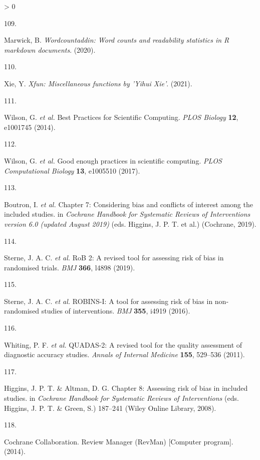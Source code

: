 \documentclass[a4paper, twoside]{templates/ociamthesis}
\newlength{\cslhangindent}
\newlength{\csllabelwidth}
\newenvironment{CSLReferences}[3] %
 {%
  \setlength{\parindent}{0pt}
  \ifodd #1 \everypar{\setlength{\hangindent}{\cslhangindent}}\ignorespaces\fi
  \ifnum #2 > 0
  \setlength{\parskip}{#2\baselineskip}
  \fi
 }%
 {}
\newcommand{\CSLLeftMargin}[1]{\parbox[t]{\maxof{\widthof{#1}}{\csllabelwidth}}{#1}}
\newcommand{\CSLRightInline}[1]{\parbox[t]{\linewidth - \csllabelwidth}{#1}}
\begin{document}
\begin{CSLReferences}{0}{0}
\leavevmode\hypertarget{ref-wordcountaddin}{}%
\CSLLeftMargin{109. }
\CSLRightInline{Marwick, B. \emph{Wordcountaddin: {Word} counts and readability statistics in {R} markdown documents}. (2020).}

\leavevmode\hypertarget{ref-xfun}{}%
\CSLLeftMargin{110. }
\CSLRightInline{Xie, Y. \emph{Xfun: {Miscellaneous} functions by '{Yihui Xie}'}. (2021).}

\leavevmode\hypertarget{ref-wilson2014}{}%
\CSLLeftMargin{111. }
\CSLRightInline{Wilson, G. \emph{et al.} Best {Practices} for {Scientific Computing}. \emph{PLOS Biology} \textbf{12}, e1001745 (2014).}

\leavevmode\hypertarget{ref-wilson2017}{}%
\CSLLeftMargin{112. }
\CSLRightInline{Wilson, G. \emph{et al.} Good enough practices in scientific computing. \emph{PLOS Computational Biology} \textbf{13}, e1005510 (2017).}

\leavevmode\hypertarget{ref-cochranechpt7}{}%
\CSLLeftMargin{113. }
\CSLRightInline{Boutron, I. \emph{et al.} Chapter 7: {Considering} bias and conflicts of interest among the included studies. in \emph{Cochrane {Handbook} for {Systematic Reviews} of {Interventions} version 6.0 (updated {August} 2019)} (eds. Higgins, J. P. T. et al.) ({Cochrane}, 2019).}

\leavevmode\hypertarget{ref-sterne2019rob}{}%
\CSLLeftMargin{114. }
\CSLRightInline{Sterne, J. A. C. \emph{et al.} {RoB} 2: A revised tool for assessing risk of bias in randomised trials. \emph{BMJ} \textbf{366}, l4898 (2019).}

\leavevmode\hypertarget{ref-sterne2016robins}{}%
\CSLLeftMargin{115. }
\CSLRightInline{Sterne, J. A. C. \emph{et al.} {ROBINS}-{I}: A tool for assessing risk of bias in non-randomised studies of interventions. \emph{BMJ} \textbf{355}, i4919 (2016).}

\leavevmode\hypertarget{ref-whiting2011quadas}{}%
\CSLLeftMargin{116. }
\CSLRightInline{Whiting, P. F. \emph{et al.} {QUADAS}-2: A revised tool for the quality assessment of diagnostic accuracy studies. \emph{Annals of Internal Medicine} \textbf{155}, 529--536 (2011).}

\leavevmode\hypertarget{ref-higgins2008assessing}{}%
\CSLLeftMargin{117. }
\CSLRightInline{Higgins, J. P. T. \& Altman, D. G. Chapter 8: {Assessing} risk of bias in included studies. in \emph{Cochrane {Handbook} for {Systematic Reviews} of {Interventions}} (eds. Higgins, J. P. T. \& Green, S.) 187--241 ({Wiley Online Library}, 2008).}

\leavevmode\hypertarget{ref-cochrane2014review}{}%
\CSLLeftMargin{118. }
\CSLRightInline{Cochrane Collaboration. Review {Manager} ({RevMan}) {[}{Computer} program{]}. (2014).}


\end{CSLReferences}
\end{document}
